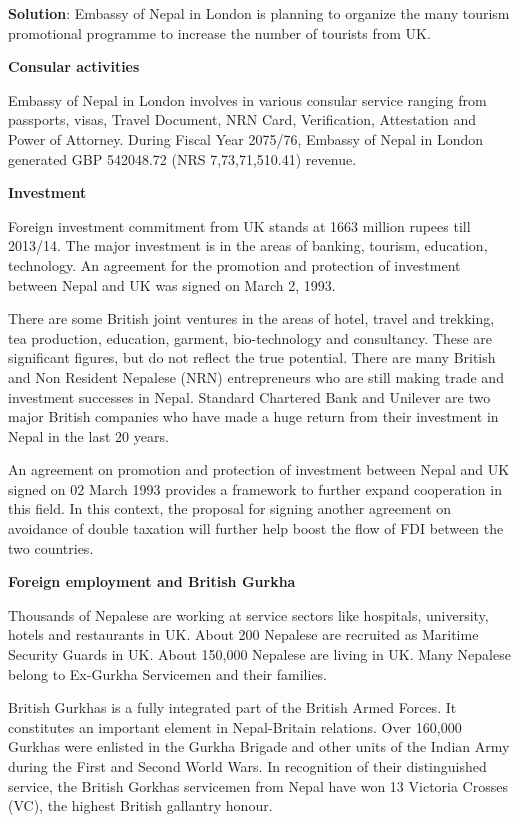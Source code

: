 \documentclass[
  openany]{book}
\newenvironment{solution}{ {\bfseries Solution}:}{}
\begin{document}
\begin{solution}
Embassy of Nepal in London is planning to organize the many tourism promotional programme to increase the number of tourists from UK.

\textbf{Consular activities}

Embassy of Nepal in London involves in various consular service ranging from passports, visas, Travel Document, NRN Card, Verification, Attestation and Power of Attorney. During Fiscal Year 2075/76, Embassy of Nepal in London generated GBP 542048.72 (NRS 7,73,71,510.41) revenue.

\textbf{Investment}

Foreign investment commitment from UK stands at 1663 million rupees till 2013/14. The major investment is in the areas of banking, tourism, education, technology. An agreement for the promotion and protection of investment between Nepal and UK was signed on March 2, 1993.

There are some British joint ventures in the areas of hotel, travel and trekking, tea production, education, garment, bio-technology and consultancy. These are significant figures, but do not reflect the true potential. There are many British and Non Resident Nepalese (NRN) entrepreneurs who are still making trade and investment successes in Nepal. Standard Chartered Bank and Unilever are two major British companies who have made a huge return from their investment in Nepal in the last 20 years.

An agreement on promotion and protection of investment between Nepal and UK signed on 02 March 1993 provides a framework to further expand cooperation in this field. In this context, the proposal for signing another agreement on avoidance of double taxation will further help boost the flow of FDI between the two countries.

\textbf{Foreign employment and British Gurkha}

Thousands of Nepalese are working at service sectors like hospitals, university, hotels and restaurants in UK. About 200 Nepalese are recruited as Maritime Security Guards in UK. About 150,000 Nepalese are living in UK. Many Nepalese belong to Ex-Gurkha Servicemen and their families.

British Gurkhas is a fully integrated part of the British Armed Forces. It constitutes an important element in Nepal-Britain relations.  Over 160,000 Gurkhas were enlisted in the Gurkha Brigade and other units of the Indian Army during the First and Second World Wars. In recognition of their distinguished service, the British Gorkhas servicemen from Nepal have won 13 Victoria Crosses (VC), the highest British gallantry honour.


\end{solution}
\end{document}
